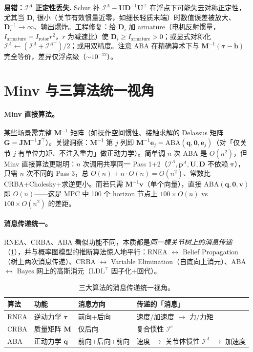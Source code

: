 \begin{note}
\textbf{易错：$\mathcal I^A$ 正定性丢失.}\;
Schur 补 $\mathcal I^A-\mathbf U\mathbf D^{-1}\mathbf U^\top$ 在浮点下可能失去对称正定性，尤其当 $\mathbf D_i$ 很小（关节有效惯量近零，如细长轻质末端）时数值误差被放大、$\mathbf D_i^{-1}\to\infty$、输出爆炸。工程修复：给 $\mathbf D_i$ 加 armature（电机反射惯量，$I_{\text{armature}}=I_{\text{rotor}}r^2$，$r$ 为减速比）使 $\mathbf D_i\geq I_{\text{armature}}>0$；或显式对称化 $\mathcal I^A\!\leftarrow\!(\mathcal I^A+\mathcal I^{A\top})/2$；或用双精度。注意 ABA 在精确算术下与 $\mathbf M^{-1}(\boldsymbol\tau-\mathbf h)$ 完全等价，差异仅浮点级（$\sim10^{-12}$）。
\end{note}

\section{Minv 与三算法统一视角}
\label{sec:on-unify}

\paragraph{Minv 直接算法。}
某些场景需完整 $\mathbf M^{-1}$ 矩阵（如操作空间惯性、接触求解的 Delassus 矩阵 $\mathbf G=\mathbf J\mathbf M^{-1}\mathbf J^\top$）。关键洞察：$\mathbf M^{-1}$ 第 $j$ 列即 $\mathbf M^{-1}\mathbf e_j=\mathrm{ABA}(\mathbf q,\mathbf 0,\mathbf e_j)$（对「仅关节 $j$ 有单位力矩、不注入重力」做正动力学）。简单调 $n$ 次 ABA 是 $O(n^2)$，但 Minv 直接算法更聪明：$n$ 次调用共享同一 Pass 1+2（$\mathcal I^A,\mathbf p^A,\mathbf U,\mathbf D$ 不依赖 $\boldsymbol\tau$），只需 $n$ 次不同的 Pass 3，总 $O(n)+n\cdot O(n)=O(n^2)$、常数比 CRBA+Cholesky+求逆更小。而若只需 $\mathbf M^{-1}\mathbf v$（单个向量），直接 $\mathrm{ABA}(\mathbf q,\mathbf 0,\mathbf v)$ 即 $O(n)$——这是 MPC 中 100 个 horizon 节点上 $100\times O(n)$ vs $100\times O(n^2)$ 的差距。

\paragraph{消息传递统一。}
RNEA、CRBA、ABA 看似功能不同，本质都是\emph{同一棵关节树上的消息传递}（\cref{tab:on-unify}），并与概率图模型的推断算法惊人地平行：RNEA $\leftrightarrow$ Belief Propagation（树上两次消息传递）、CRBA $\leftrightarrow$ Variable Elimination（自底向上消元）、ABA $\leftrightarrow$ Bayes 网上的高斯消元（$\mathrm{LDL}^\top$ 因子化+回代）。

\begin{table}[H]\centering\small
\caption{三大算法的消息传递统一视角。}
\label{tab:on-unify}
\begin{tabular}{llll}
\toprule
算法 & 功能 & 消息方向 & 传递的「消息」 \\
\midrule
RNEA & 逆动力学 $\boldsymbol\tau$ & 前向+后向 & 速度/加速度 $\to$ 力/力矩 \\
CRBA & 质量矩阵 $\mathbf M$ & 仅后向 & 复合惯性 $\mathcal I^c$ \\
ABA & 正动力学 $\ddot{\mathbf q}$ & 前向+后向+前向 & 速度 $\to$ 关节体惯性 $\mathcal I^A$ $\to$ 加速度 \\
\bottomrule
\end{tabular}
\end{table}

